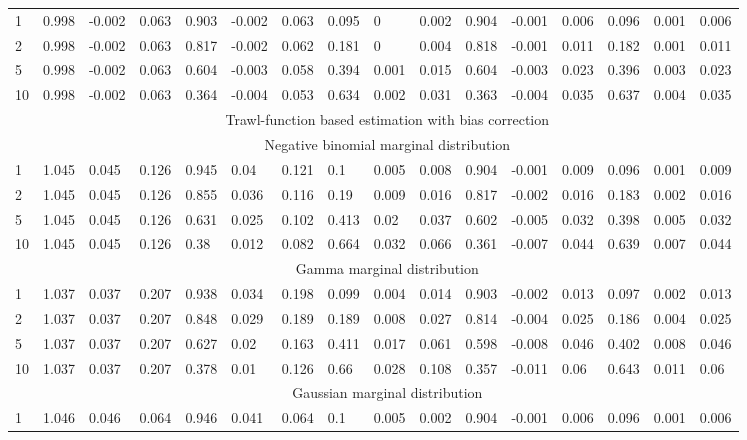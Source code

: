 \documentclass{article}
\theoremstyle{plain}
\theoremstyle{definition}
\theoremstyle{remark}
\begin{document}
\begin{appendix}
{\begin{table}[ht]
\begin{tabular}{l|lll|lll|lll|lll|lll}
   1 & 0.998 & -0.002 & 0.063 & 0.903 & -0.002 & 0.063 & 0.095 & 0 & 0.002 & 0.904 & -0.001 & 0.006 & 0.096 & 0.001 & 0.006 \\ 
  2 & 0.998 & -0.002 & 0.063 & 0.817 & -0.002 & 0.062 & 0.181 & 0 & 0.004 & 0.818 & -0.001 & 0.011 & 0.182 & 0.001 & 0.011 \\ 
  5 & 0.998 & -0.002 & 0.063 & 0.604 & -0.003 & 0.058 & 0.394 & 0.001 & 0.015 & 0.604 & -0.003 & 0.023 & 0.396 & 0.003 & 0.023 \\ 
  10 & 0.998 & -0.002 & 0.063 & 0.364 & -0.004 & 0.053 & 0.634 & 0.002 & 0.031 & 0.363 & -0.004 & 0.035 & 0.637 & 0.004 & 0.035 \\ 
   \midrule	
   &\multicolumn{15}{c}{Trawl-function based estimation with bias correction}\\ \midrule
   &\multicolumn{15}{c}{Negative binomial marginal distribution}\\
  1 & 1.045 & 0.045 & 0.126 & 0.945 & 0.04 & 0.121 & 0.1 & 0.005 & 0.008 & 0.904 & -0.001 & 0.009 & 0.096 & 0.001 & 0.009 \\ 
  2 & 1.045 & 0.045 & 0.126 & 0.855 & 0.036 & 0.116 & 0.19 & 0.009 & 0.016 & 0.817 & -0.002 & 0.016 & 0.183 & 0.002 & 0.016 \\ 
  5 & 1.045 & 0.045 & 0.126 & 0.631 & 0.025 & 0.102 & 0.413 & 0.02 & 0.037 & 0.602 & -0.005 & 0.032 & 0.398 & 0.005 & 0.032 \\ 
  10 & 1.045 & 0.045 & 0.126 & 0.38 & 0.012 & 0.082 & 0.664 & 0.032 & 0.066 & 0.361 & -0.007 & 0.044 & 0.639 & 0.007 & 0.044 \\ 
     \midrule
   &\multicolumn{15}{c}{Gamma marginal distribution}\\
  1 & 1.037 & 0.037 & 0.207 & 0.938 & 0.034 & 0.198 & 0.099 & 0.004 & 0.014 & 0.903 & -0.002 & 0.013 & 0.097 & 0.002 & 0.013 \\ 
  2 & 1.037 & 0.037 & 0.207 & 0.848 & 0.029 & 0.189 & 0.189 & 0.008 & 0.027 & 0.814 & -0.004 & 0.025 & 0.186 & 0.004 & 0.025 \\ 
  5 & 1.037 & 0.037 & 0.207 & 0.627 & 0.02 & 0.163 & 0.411 & 0.017 & 0.061 & 0.598 & -0.008 & 0.046 & 0.402 & 0.008 & 0.046 \\ 
  10 & 1.037 & 0.037 & 0.207 & 0.378 & 0.01 & 0.126 & 0.66 & 0.028 & 0.108 & 0.357 & -0.011 & 0.06 & 0.643 & 0.011 & 0.06 \\ 
     \midrule
   &\multicolumn{15}{c}{Gaussian marginal distribution}\\
  1 & 1.046 & 0.046 & 0.064 & 0.946 & 0.041 & 0.064 & 0.1 & 0.005 & 0.002 & 0.904 & -0.001 & 0.006 & 0.096 & 0.001 & 0.006 \\ 

\end{tabular}
\end{table}}
\end{appendix}
\end{document}
